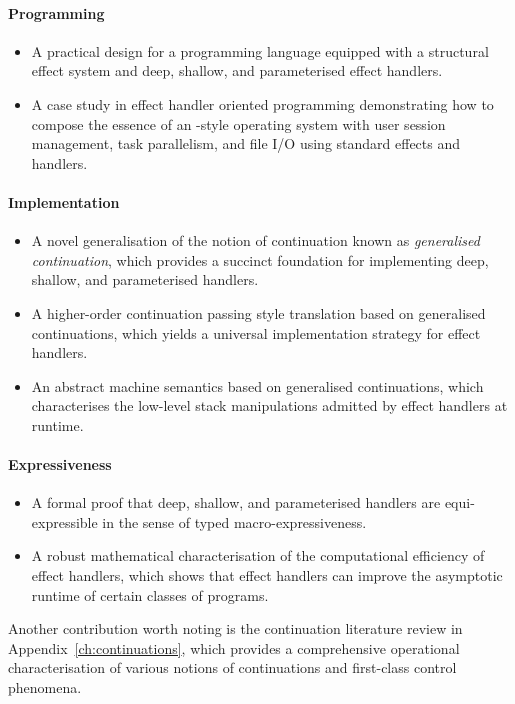 \documentclass[12pt,phd,lfcs,twoside,openright,logo,leftchapter,normalheadings]{infthesis}
\theoremstyle{plain}
\theoremstyle{definition}
\begin{document}
\paragraph{Programming}
\begin{itemize}
  \item A practical design for a programming language equipped with a
    structural effect system and deep, shallow, and parameterised effect
    handlers.
  \item A case study in effect handler oriented programming
    demonstrating how to compose the essence of an \UNIX{}-style
    operating system with user session management, task parallelism,
    and file I/O using standard effects and handlers.
\end{itemize}

\paragraph{Implementation}
\begin{itemize}
  \item A novel generalisation of the notion of continuation known as
    \emph{generalised continuation}, which provides a succinct
    foundation for implementing deep, shallow, and parameterised
    handlers.
  \item A higher-order continuation passing style translation based on
    generalised continuations, which yields a universal implementation
    strategy for effect handlers.
  \item An abstract machine semantics based on generalised
    continuations, which characterises the low-level stack
    manipulations admitted by effect handlers at runtime.
\end{itemize}
\paragraph{Expressiveness}
\begin{itemize}
  \item A formal proof that deep, shallow, and parameterised handlers
    are equi-expressible in the sense of typed macro-expressiveness.
  \item A robust mathematical characterisation of the computational
    efficiency of effect handlers, which shows that effect handlers
    can improve the asymptotic runtime of certain classes of programs.
\end{itemize}

Another contribution worth noting is the continuation literature
review in Appendix~\ref{ch:continuations}, which provides a
comprehensive operational characterisation of various notions of
continuations and first-class control phenomena.
\end{document}
